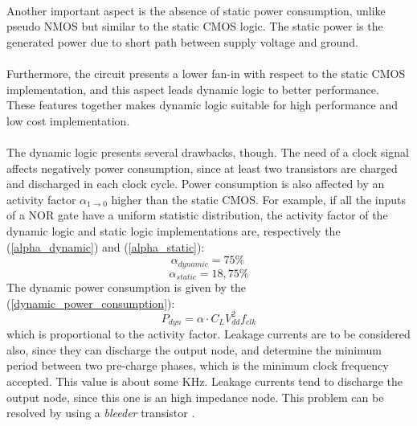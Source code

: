 \paragraph{} Another important aspect is the absence of static power consumption, unlike pseudo NMOS but similar to the static CMOS logic. The static power is the generated power due to short path between supply voltage and ground.

\paragraph{} Furthermore, the circuit presents a lower fan-in with respect to the static CMOS implementation, and this aspect leads dynamic logic to better performance. These features together makes dynamic logic suitable for high performance and low cost implementation.

\paragraph{} The dynamic logic presents several drawbacks, though. The need of a clock signal affects negatively power consumption, since at least two transistors are charged and discharged in each clock cycle. Power consumption is also affected by an activity factor $\alpha_{1 \rightarrow 0}$ higher than the static CMOS. For example, if all the inputs of a NOR gate have a uniform statistic distribution, the activity factor of the dynamic logic and static logic implementations are, respectively the (\ref{alpha_dynamic}) and (\ref{alpha_static}):
\begin{equation}
\alpha_{dynamic} = 75\% \
\label{alpha_dynamic}
\end{equation}
\begin{equation}
\alpha_{static} = 18,75\%
\label{alpha_static}
\end{equation}
The dynamic power consumption is given by the (\ref{dynamic_power_consumption}):
\begin{equation}
P_{dyn} = \alpha\cdot C_L V_{dd}^2 f_{clk}
\label{dynamic_power_consumption}
\end{equation}
which is proportional to the activity factor. Leakage currents are to be considered also, since they can discharge the output node, and determine the minimum period between two pre-charge phases, which is the minimum clock frequency accepted. This value is about some KHz. Leakage currents tend to discharge the output node, since this one is an high impedance node. This problem can be resolved by using a \textit{bleeder} transistor \cite{Rabaey}.

